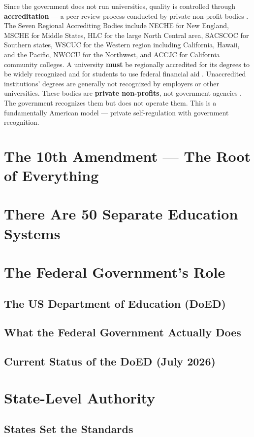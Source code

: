 Since the government does not run universities, quality is controlled through \textbf{accreditation} --- a peer-review process conducted by private non-profit bodies \cite{accreditation-chea}. The Seven Regional Accrediting Bodies include NECHE for New England, MSCHE for Middle States, HLC for the large North Central area, SACSCOC for Southern states, WSCUC for the Western region including California, Hawaii, and the Pacific, NWCCU for the Northwest, and ACCJC for California community colleges.
A university \textbf{must} be regionally accredited for its degrees to be widely recognized and for students to use federal financial aid \cite{accreditation-chea}. Unaccredited institutions' degrees are generally not recognized by employers or other universities. These bodies are \textbf{private non-profits}, not government agencies \cite{accreditation-chea}. The government recognizes them but does not operate them. This is a fundamentally American model --- private self-regulation with government recognition.



\section{The 10th Amendment --- The Root of Everything}
\section{There Are 50 Separate Education Systems}
\section{The Federal Government's Role}
\subsection{The US Department of Education (DoED)}
\subsection{What the Federal Government Actually Does}
\subsection{Current Status of the DoED (July 2026)}

\section{State-Level Authority}
\subsection{States Set the Standards}
